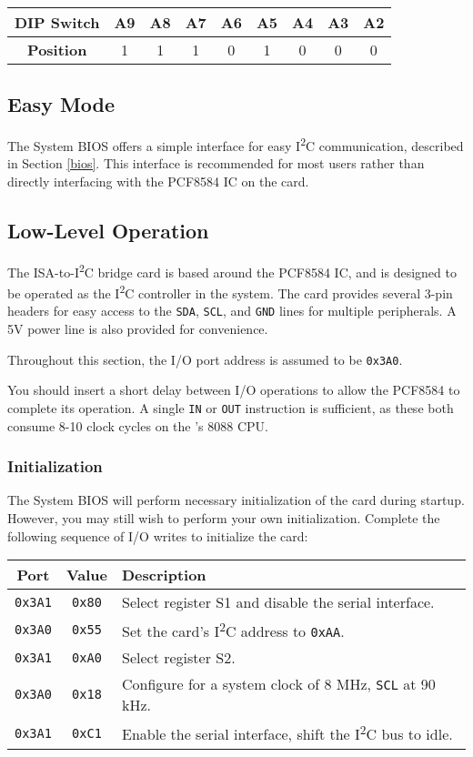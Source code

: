 \documentclass[twoside,10pt,letterpaper]{refart}
\newcommand{\itwoc}{I\textsuperscript{2}C}
\begin{document}
\begin{center}
    \begin{tabular}{ c|c|c|c|c|c|c|c|c }
        \textbf{DIP Switch} & A9 & A8 & A7 & A6 & A5 & A4 & A3 & A2 \\
        \hline
        \textbf{Position} & 1 & 1 & 1 & 0 & 1 & 0 & 0 & 0
    \end{tabular}
\end{center}

\subsection{Easy Mode}
The  System BIOS offers a simple interface for easy \itwoc{} communication, described in Section \ref{bios}.
This interface is recommended for most users rather than directly interfacing with the PCF8584 IC on the card.

\subsection{Low-Level Operation}
The ISA-to-\itwoc{} bridge card is based around the PCF8584 IC, and is designed to be operated as the \itwoc
controller in the system. The card provides several 3-pin headers for easy access to the \texttt{SDA}, \texttt{SCL},
and \texttt{GND} lines for multiple peripherals. A 5V power line is also provided for convenience.

Throughout this section, the I/O port address is assumed to be \texttt{0x3A0}.

You should insert a short delay between I/O operations to allow the PCF8584 to complete its operation. A single
\texttt{IN} or \texttt{OUT} instruction is sufficient, as these both consume 8-10 clock cycles on the 's 8088
CPU.

\subsubsection{Initialization}
The  System BIOS will perform necessary initialization of the card during startup.
However, you may still wish to perform your own initialization. Complete the following sequence of I/O writes
to initialize the card:

\begin{center}
    \begin{tabular}{ c|c|l }
        \textbf{Port} & \textbf{Value} & \textbf{Description} \\
        \hline
        \texttt{0x3A1} & \texttt{0x80} & Select register S1 and disable the serial interface. \\
        \texttt{0x3A0} & \texttt{0x55} & Set the card's \itwoc{} address to \texttt{0xAA}. \\
        \texttt{0x3A1} & \texttt{0xA0} & Select register S2. \\
        \texttt{0x3A0} & \texttt{0x18} & Configure for a system clock of 8 MHz\footnotemark, \texttt{SCL} at 90 kHz. \\
        \texttt{0x3A1} & \texttt{0xC1} & Enable the serial interface, shift the \itwoc{} bus to idle. \\
    \end{tabular}
\end{center}
\end{document}
